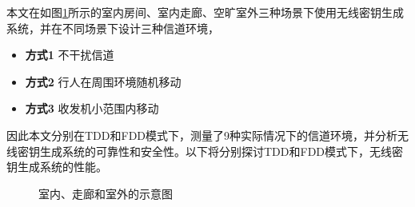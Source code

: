\documentclass[master]{seuthesis} %
\begin{document}
\begin{Main}
本文在如图\ref{sketch_scene}所示的室内房间、室内走廊、空旷室外三种场景下使用无线密钥生成系统，并在不同场景下设计三种信道环境，

\begin{itemize}
    \item \textbf{方式1} 不干扰信道
    \item \textbf{方式2} 行人在周围环境随机移动
    \item \textbf{方式3} 收发机小范围内移动   
\end{itemize}

因此本文分别在TDD和FDD模式下，测量了9种实际情况下的信道环境，并分析无线密钥生成系统的可靠性和安全性。以下将分别探讨TDD和FDD模式下，无线密钥生成系统的性能。

\begin{figure}
    \centering
    \quad
    \quad
    \quad
    \caption{室内、走廊和室外的示意图}{}
    \label{sketch_scene}
\end{figure}
  

\end{Main}
\end{document}
